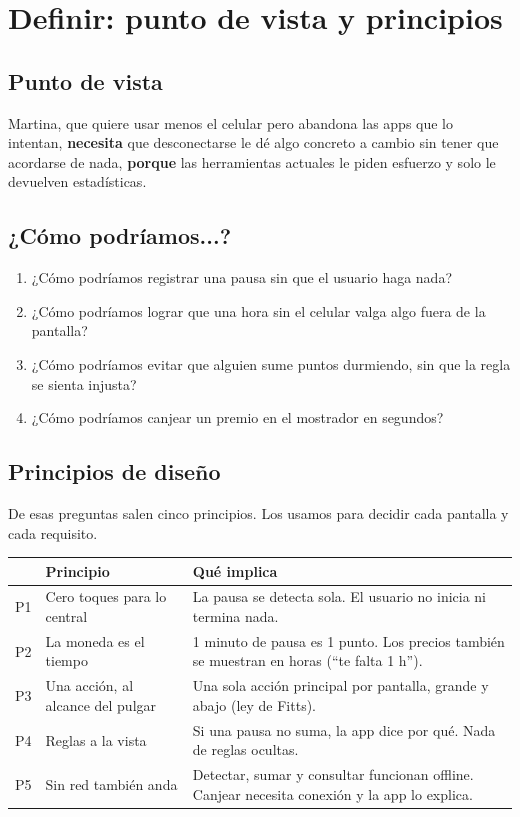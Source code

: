 \section{Definir: punto de vista y principios}
\label{sec:definir}

\subsection{Punto de vista}

\begin{nota}
Martina, que quiere usar menos el celular pero abandona las apps que lo intentan, \textbf{necesita} que desconectarse le dé algo concreto a cambio sin tener que acordarse de nada, \textbf{porque} las herramientas actuales le piden esfuerzo y solo le devuelven estadísticas.
\end{nota}

\subsection{¿Cómo podríamos...?}

\begin{enumerate}[label=\textbf{HMW\arabic*}]
\item ¿Cómo podríamos registrar una pausa sin que el usuario haga nada?
\item ¿Cómo podríamos lograr que una hora sin el celular valga algo fuera de la pantalla?
\item ¿Cómo podríamos evitar que alguien sume puntos durmiendo, sin que la regla se sienta injusta?
\item ¿Cómo podríamos canjear un premio en el mostrador en segundos?
\end{enumerate}

\subsection{Principios de diseño}

De esas preguntas salen cinco principios. Los usamos para decidir cada pantalla y cada requisito.

\begin{table}[H]
\centering\small
\begin{tabularx}{\textwidth}{@{}l l L@{}}
\toprule
& \textbf{Principio} & \textbf{Qué implica} \\
\midrule
P1 & Cero toques para lo central & La pausa se detecta sola. El usuario no inicia ni termina nada. \\
P2 & La moneda es el tiempo & 1 minuto de pausa es 1 punto. Los precios también se muestran en horas (“te falta 1 h”). \\
P3 & Una acción, al alcance del pulgar & Una sola acción principal por pantalla, grande y abajo (ley de Fitts). \\
P4 & Reglas a la vista & Si una pausa no suma, la app dice por qué. Nada de reglas ocultas. \\
P5 & Sin red también anda & Detectar, sumar y consultar funcionan offline. Canjear necesita conexión y la app lo explica. \\
\bottomrule
\end{tabularx}
\end{table}
